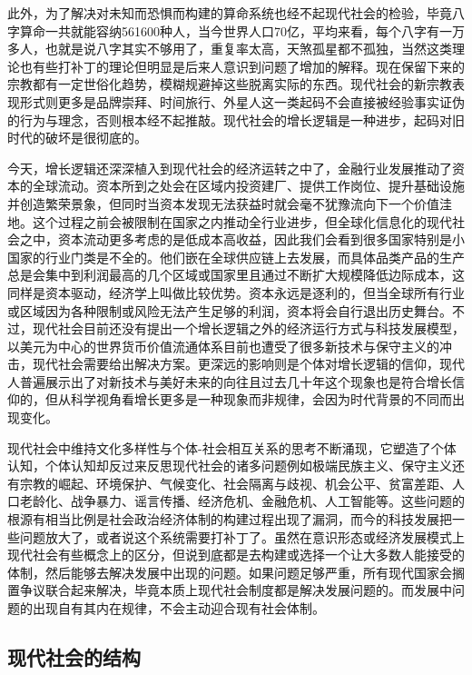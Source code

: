 \documentclass[]{tufte-book}
\begin{document}
此外，为了解决对未知而恐惧而构建的算命系统也经不起现代社会的检验，毕竟八字算命一共就能容纳561600种人，当今世界人口70亿，平均来看，每个八字有一万多人，也就是说八字其实不够用了，重复率太高，天煞孤星都不孤独，当然这类理论也有些打补丁的理论但明显是后来人意识到问题了增加的解释。现在保留下来的宗教都有一定世俗化趋势，模糊规避掉这些脱离实际的东西。现代社会的新宗教表现形式则更多是品牌崇拜、时间旅行、外星人这一类起码不会直接被经验事实证伪的行为与理念，否则根本经不起推敲。现代社会的增长逻辑是一种进步，起码对旧时代的破坏是很彻底的。

今天，增长逻辑还深深植入到现代社会的经济运转之中了，金融行业发展推动了资本的全球流动。资本所到之处会在区域内投资建厂、提供工作岗位、提升基础设施并创造繁荣景象，但同时当资本发现无法获益时就会毫不犹豫流向下一个价值洼地。这个过程之前会被限制在国家之内推动全行业进步，但全球化信息化的现代社会之中，资本流动更多考虑的是低成本高收益，因此我们会看到很多国家特别是小国家的行业门类是不全的。他们嵌在全球供应链上去发展，而具体品类产品的生产总是会集中到利润最高的几个区域或国家里且通过不断扩大规模降低边际成本，这同样是资本驱动，经济学上叫做比较优势。资本永远是逐利的，但当全球所有行业或区域因为各种限制或风险无法产生足够的利润，资本将会自行退出历史舞台。不过，现代社会目前还没有提出一个增长逻辑之外的经济运行方式与科技发展模型，以美元为中心的世界货币价值流通体系目前也遭受了很多新技术与保守主义的冲击，现代社会需要给出解决方案。更深远的影响则是个体对增长逻辑的信仰，现代人普遍展示出了对新技术与美好未来的向往且过去几十年这个现象也是符合增长信仰的，但从科学视角看增长更多是一种现象而非规律，会因为时代背景的不同而出现变化。

现代社会中维持文化多样性与个体-社会相互关系的思考不断涌现，它塑造了个体认知，个体认知却反过来反思现代社会的诸多问题例如极端民族主义、保守主义还有宗教的崛起、环境保护、气候变化、社会隔离与歧视、机会公平、贫富差距、人口老龄化、战争暴力、谣言传播、经济危机、金融危机、人工智能等。这些问题的根源有相当比例是社会政治经济体制的构建过程出现了漏洞，而今的科技发展把一些问题放大了，或者说这个系统需要打补丁了。虽然在意识形态或经济发展模式上现代社会有些概念上的区分，但说到底都是去构建或选择一个让大多数人能接受的体制，然后能够去解决发展中出现的问题。如果问题足够严重，所有现代国家会搁置争议联合起来解决，毕竟本质上现代社会制度都是解决发展问题的。而发展中问题的出现自有其内在规律，不会主动迎合现有社会体制。

\hypertarget{ux73b0ux4ee3ux793eux4f1aux7684ux7ed3ux6784}{%
\subsection{现代社会的结构}\label{ux73b0ux4ee3ux793eux4f1aux7684ux7ed3ux6784}}
\end{document}
